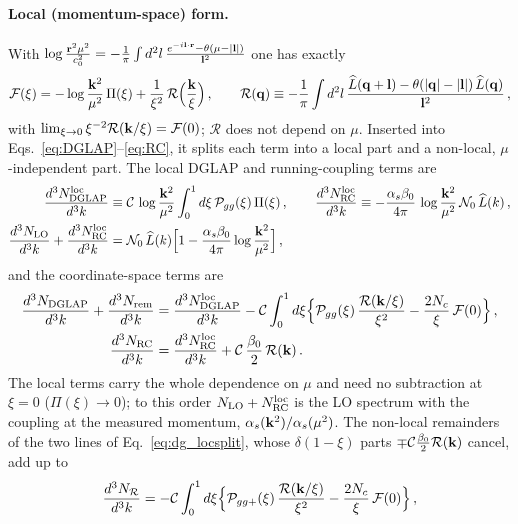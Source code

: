 \paragraph{Local (momentum-space) form.} With $\log\frac{\mathbf{r}^2\mu^2}{c_0^2}=-\frac1\pi\int d^2l\,\frac{e^{-i\mathbf{l}\cdot\mathbf{r}}-\theta(\mu-|\mathbf{l}|)}{\mathbf{l}^2}$ one has exactly
\begin{align}\label{eq:dg_loc}
\mathcal F(\xi)=-\log\frac{\mathbf{k}^2}{\mu^2}\,\Pi(\xi)+\frac{1}{\xi^2}\,\mathcal R\Big(\frac{\mathbf{k}}{\xi}\Big)\,,\qquad
\mathcal R(\mathbf{q})\equiv-\frac1\pi\int d^2l\,\frac{\widehat L(\mathbf{q}+\mathbf{l})-\theta(|\mathbf{q}|-|\mathbf{l}|)\,\widehat L(\mathbf{q})}{\mathbf{l}^2}\,,
\end{align}
with $\lim_{\xi\to0}\xi^{-2}\mathcal R(\mathbf{k}/\xi)=\mathcal F(0)$; $\mathcal R$ does not depend on $\mu$. Inserted into Eqs.~\eqref{eq:DGLAP}--\eqref{eq:RC}, it splits each term into a local part and a non-local, $\mu$-independent part. The local DGLAP and running-coupling terms are
\begin{align}\label{eq:dg_local}
\frac{d^3N^{\rm loc}_{\rm DGLAP}}{d^3k}&\equiv\mathcal C\,\log\frac{\mathbf{k}^2}{\mu^2}\int_0^1d\xi\,\mathcal P_{gg}(\xi)\,\Pi(\xi)\,,\qquad
\frac{d^3N^{\rm loc}_{\rm RC}}{d^3k}\equiv-\frac{\alpha_s\beta_0}{4\pi}\,\log\frac{\mathbf{k}^2}{\mu^2}\,\mathcal N_0\,\widehat L(k)\,,\notag\\
\frac{d^3N_{\rm LO}}{d^3k}+\frac{d^3N^{\rm loc}_{\rm RC}}{d^3k}&=\mathcal N_0\,\widehat L(k)\Big[1-\frac{\alpha_s\beta_0}{4\pi}\log\frac{\mathbf{k}^2}{\mu^2}\Big]\,,
\end{align}
and the coordinate-space terms are
\begin{align}\label{eq:dg_locsplit}
\frac{d^3N_{\rm DGLAP}}{d^3k}+\frac{d^3N_{\rm rem}}{d^3k}&=\frac{d^3N^{\rm loc}_{\rm DGLAP}}{d^3k}-\mathcal C\int_0^1d\xi\Big\{\mathcal P_{gg}(\xi)\,\frac{\mathcal R(\mathbf{k}/\xi)}{\xi^2}-\frac{2N_c}{\xi}\,\mathcal F(0)\Big\}\,,\notag\\
\frac{d^3N_{\rm RC}}{d^3k}&=\frac{d^3N^{\rm loc}_{\rm RC}}{d^3k}+\mathcal C\,\frac{\beta_0}{2}\,\mathcal R(\mathbf{k})\,.
\end{align}
The local terms carry the whole dependence on $\mu$ and need no subtraction at $\xi=0$ ($\Pi(\xi)\to0$); to this order $N_{\rm LO}+N^{\rm loc}_{\rm RC}$ is the LO spectrum with the coupling at the measured momentum, $\alpha_s(\mathbf{k}^2)/\alpha_s(\mu^2)$. The non-local remainders of the two lines of Eq.~\eqref{eq:dg_locsplit}, whose $\delta(1-\xi)$ parts $\mp\mathcal C\frac{\beta_0}{2}\mathcal R(\mathbf{k})$ cancel, add up to
\begin{align}\label{eq:dg_R}
\frac{d^3N_{\mathcal R}}{d^3k}=-\mathcal C\int_0^1d\xi\Big\{\mathcal P_{gg+}(\xi)\,\frac{\mathcal R(\mathbf{k}/\xi)}{\xi^2}-\frac{2N_c}{\xi}\,\mathcal F(0)\Big\}\,,
\end{align}
